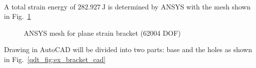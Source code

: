 \paragraph{}
A total strain energy of $\SI{282.927}{\joule}$ is determined by ANSYS with the mesh shown in Fig.~\ref{qdt_fig:ex_bracket_ansys_mesh}
    \begin{figure}[H]
        \centering
        \caption{ANSYS mesh for plane strain bracket (62004 DOF)}
        \label{qdt_fig:ex_bracket_ansys_mesh}
    \end{figure}
%
Drawing in AutoCAD will be divided into two parts: base and the holes as shown in Fig.~\ref{qdt_fig:ex_bracket_cad}
